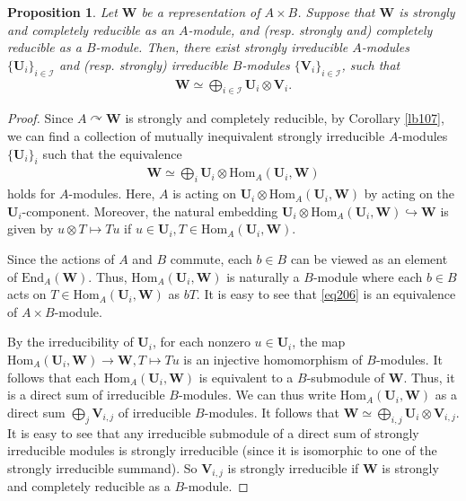 \documentclass[12pt,b5paper,notitlepage]{report}
\theoremstyle{definition}
\theoremstyle{plain}
\newtheorem{pp}[df]{Proposition}
\newcommand{\mc}{\mathcal}
\newcommand{\End}{\mathrm{End}} %
\newcommand{\Hom}{\mathrm{Hom}}
\newcommand{\mbf}{\mathbf}
\numberwithin{equation}{section}
\begin{document}
\begin{pp}\label{lb101}
Let $\mbf W$ be a   representation of $A\times B$. Suppose that $\mbf W$ is strongly and completely reducible as an $A$-module, and (resp. strongly and) completely reducible  as a $B$-module. Then, there exist  strongly irreducible $A$-modules $\{\mbf U_i\}_{i\in\mc I}$ and (resp. strongly) irreducible $B$-modules $\{\mbf V_i\}_{i\in\mc I}$, such that
\begin{align*}
\mbf W\simeq\bigoplus_{i\in\mc I} \mbf U_i\otimes\mbf V_i.
\end{align*}
\end{pp}



\begin{proof}
Since $A\curvearrowright\mbf W$ is strongly and completely reducible, by Corollary \ref{lb107}, we can find a collection of mutually inequivalent strongly irreducible $A$-modules $\{\mbf U_i\}_i$ such that the equivalence
\begin{align}
\mbf W\simeq\bigoplus_i\mbf U_i\otimes \Hom_A(\mbf U_i,\mbf W)\label{eq206}
\end{align}
holds for $A$-modules. Here, $A$ is acting on $\mbf U_i\otimes \Hom_A(\mbf U_i,\mbf W)$ by acting on the $\mbf U_i$-component. Moreover, the natural embedding $\mbf U_i\otimes \Hom_A(\mbf U_i,\mbf W)\hookrightarrow\mbf W$ is given by $u\otimes T\mapsto Tu$ if $u\in\mbf U_i,T\in \Hom_A(\mbf U_i,\mbf W)$. 
	
Since the actions of $A$ and $B$ commute, each $b\in B$ can be viewed as an element of $\End_A(\mbf W)$. Thus, $\Hom_A(\mbf U_i,\mbf W)$ is naturally a $B$-module where each $b\in B$ acts on $T\in \Hom_A(\mbf U_i,\mbf W)$ as $bT$. It is easy to see that \eqref{eq206} is an equivalence of $A\times B$-module. 

By the irreducibility of $\mbf U_i$, for each nonzero $u\in\mbf U_i$, the map $\Hom_A(\mbf U_i,\mbf W)\rightarrow\mbf W,T\mapsto Tu$ is an injective homomorphism of $B$-modules. It follows that each $\Hom_A(\mbf U_i,\mbf W)$ is  equivalent to a $B$-submodule of $\mbf W$. Thus, it is a direct sum of  irreducible $B$-modules. We can thus write $\Hom_A(\mbf U_i,\mbf W)$ as a  direct sum $\bigoplus_j\mbf V_{i,j}$ of  irreducible $B$-modules. It follows that $\mbf W\simeq\bigoplus_{i,j}\mbf U_i\otimes\mbf V_{i,j}$. It is easy to see that any irreducible submodule of a direct sum of strongly irreducible modules is strongly irreducible (since it is isomorphic to one of the strongly irreducible summand). So $\mbf V_{i,j}$ is strongly irreducible if $\mbf W$ is strongly and completely reducible as a $B$-module.
\end{proof}
\end{document}
